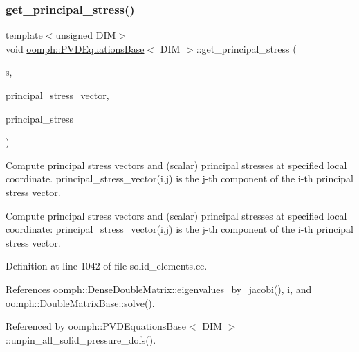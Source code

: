 \subsubsection{\texorpdfstring{get\+\_\+principal\+\_\+stress()}{get\_principal\_stress()}}
{\footnotesize\ttfamily template$<$unsigned D\+IM$>$ \\
void \hyperlink{classoomph_1_1PVDEquationsBase}{oomph\+::\+P\+V\+D\+Equations\+Base}$<$ D\+IM $>$\+::get\+\_\+principal\+\_\+stress (\begin{DoxyParamCaption}\item[{const \hyperlink{classoomph_1_1Vector}{Vector}$<$ double $>$ \&}]{s,  }\item[{\hyperlink{classoomph_1_1DenseMatrix}{Dense\+Matrix}$<$ double $>$ \&}]{principal\+\_\+stress\+\_\+vector,  }\item[{\hyperlink{classoomph_1_1Vector}{Vector}$<$ double $>$ \&}]{principal\+\_\+stress }\end{DoxyParamCaption})}



Compute principal stress vectors and (scalar) principal stresses at specified local coordinate. {\ttfamily principal\+\_\+stress\+\_\+vector(i,j)} is the j-\/th component of the i-\/th principal stress vector. 

Compute principal stress vectors and (scalar) principal stresses at specified local coordinate\+: {\ttfamily principal\+\_\+stress\+\_\+vector(i,j)} is the j-\/th component of the i-\/th principal stress vector. 

Definition at line 1042 of file solid\+\_\+elements.\+cc.



References oomph\+::\+Dense\+Double\+Matrix\+::eigenvalues\+\_\+by\+\_\+jacobi(), i, and oomph\+::\+Double\+Matrix\+Base\+::solve().



Referenced by oomph\+::\+P\+V\+D\+Equations\+Base$<$ D\+I\+M $>$\+::unpin\+\_\+all\+\_\+solid\+\_\+pressure\+\_\+dofs().

\mbox{\label{classoomph_1_1PVDEquationsBase_a8fa551e7ac975affcf3bc281262a6849}} 
